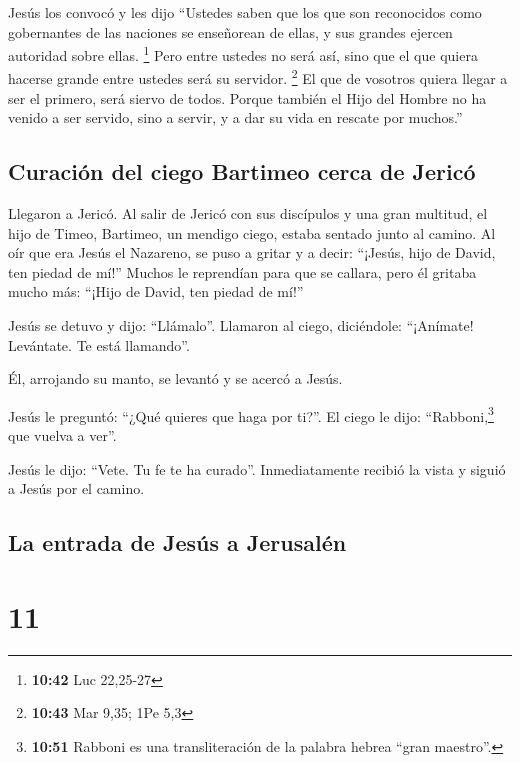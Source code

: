  Jesús los convocó y les dijo ``Ustedes saben que los que
son reconocidos como gobernantes de las naciones se enseñorean de ellas,
y sus grandes ejercen autoridad sobre ellas. \footnote{\textbf{10:42}
  Luc 22,25-27}  Pero entre ustedes no será así, sino que
el que quiera hacerse grande entre ustedes será su servidor. \footnote{\textbf{10:43}
  Mar 9,35; 1Pe 5,3}  El que de vosotros quiera llegar a
ser el primero, será siervo de todos.  Porque también el
Hijo del Hombre no ha venido a ser servido, sino a servir, y a dar su
vida en rescate por muchos.''

\hypertarget{curaciuxf3n-del-ciego-bartimeo-cerca-de-jericuxf3}{%
\subsection{Curación del ciego Bartimeo cerca de
Jericó}\label{curaciuxf3n-del-ciego-bartimeo-cerca-de-jericuxf3}}

 Llegaron a Jericó. Al salir de Jericó con sus discípulos
y una gran multitud, el hijo de Timeo, Bartimeo, un mendigo ciego,
estaba sentado junto al camino.  Al oír que era Jesús el
Nazareno, se puso a gritar y a decir: ``¡Jesús, hijo de David, ten
piedad de mí!''  Muchos le reprendían para que se
callara, pero él gritaba mucho más: ``¡Hijo de David, ten piedad de
mí!''

 Jesús se detuvo y dijo: ``Llámalo''. Llamaron al ciego,
diciéndole: ``¡Anímate! Levántate. Te está llamando''.

 Él, arrojando su manto, se levantó y se acercó a Jesús.

 Jesús le preguntó: ``¿Qué quieres que haga por ti?''. El
ciego le dijo: ``Rabboni,\footnote{\textbf{10:51} Rabboni es una
  transliteración de la palabra hebrea ``gran maestro''.} que vuelva a
ver''.

 Jesús le dijo: ``Vete. Tu fe te ha curado''.
Inmediatamente recibió la vista y siguió a Jesús por el camino.

\hypertarget{la-entrada-de-jesuxfas-a-jerusaluxe9n}{%
\subsection{La entrada de Jesús a
Jerusalén}\label{la-entrada-de-jesuxfas-a-jerusaluxe9n}}

\hypertarget{section-10}{%
\section{11}\label{section-10}}

